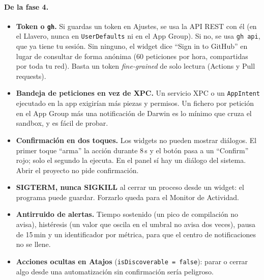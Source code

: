\documentclass[11pt,a4paper]{article}
\begin{document}
\paragraph{De la fase 4.}
\begin{itemize}
  \item \textbf{Token o \texttt{gh}.} Si guardas un token en Ajustes,
    se usa la API REST con él (en el Llavero, nunca en
    \texttt{UserDefaults} ni en el App Group). Si no, se usa
    \texttt{gh api}, que ya tiene tu sesión. Sin ninguno, el widget
    dice ``Sign in to GitHub'' en lugar de consultar de forma anónima
    (60 peticiones por hora, compartidas por toda tu red). Basta un
    token \emph{fine-grained} de solo lectura (Actions y Pull
    requests).
  \item \textbf{Bandeja de peticiones en vez de XPC.} Un servicio XPC
    o un \texttt{AppIntent} ejecutado en la app exigirían más piezas
    y permisos. Un fichero por petición en el App Group más una
    notificación de Darwin es lo mínimo que cruza el sandbox, y es
    fácil de probar.
  \item \textbf{Confirmación en dos toques.} Los widgets no pueden
    mostrar diálogos. El primer toque ``arma'' la acción durante 8\,s
    y el botón pasa a un ``Confirm'' rojo; solo el segundo la
    ejecuta. En el panel sí hay un diálogo del sistema. Abrir el
    proyecto no pide confirmación.
  \item \textbf{SIGTERM, nunca SIGKILL} al cerrar un proceso desde un
    widget: el programa puede guardar. Forzarlo queda para el
    Monitor de Actividad.
  \item \textbf{Antirruido de alertas.} Tiempo sostenido (un pico de
    compilación no avisa), histéresis (un valor que oscila en el
    umbral no avisa dos veces), pausa de 15\,min y un identificador
    por métrica, para que el centro de notificaciones no se llene.
  \item \textbf{Acciones ocultas en Atajos}
    (\texttt{isDiscoverable = false}): parar o cerrar algo desde una
    automatización sin confirmación sería peligroso.
\end{itemize}
\end{document}
